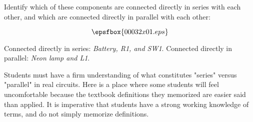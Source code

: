 

Identify which of these components are connected directly in series with each other, and which are connected directly in parallel with each other:

$$\epsfbox{00032x01.eps}$$







Connected directly in series: {\it Battery, R1, and SW1}.  Connected directly in parallel: {\it Neon lamp and L1}.







Students must have a firm understanding of what constitutes "series" versus "parallel" in real circuits.  Here is a place where some students will feel uncomfortable because the textbook definitions they memorized are easier said than applied.  It is imperative that students have a strong working knowledge of terms, and do not simply memorize definitions.




